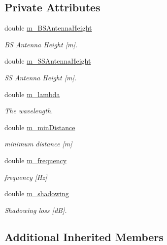 \subsection*{Private Attributes}
\begin{DoxyCompactItemize}
\item 
double \hyperlink{classns3_1_1Cost231PropagationLossModel_ad564778df097fefd5c461ebc814f9d22}{m\+\_\+\+B\+S\+Antenna\+Height}
\begin{DoxyCompactList}\small\item\em BS Antenna Height \mbox{[}m\mbox{]}. \end{DoxyCompactList}\item 
double \hyperlink{classns3_1_1Cost231PropagationLossModel_a143ebc7328775a1c8b5c48ec12692dc1}{m\+\_\+\+S\+S\+Antenna\+Height}
\begin{DoxyCompactList}\small\item\em SS Antenna Height \mbox{[}m\mbox{]}. \end{DoxyCompactList}\item 
double \hyperlink{classns3_1_1Cost231PropagationLossModel_a24ca1169081f00f44d025f6a10bf6db0}{m\+\_\+lambda}
\begin{DoxyCompactList}\small\item\em The wavelength. \end{DoxyCompactList}\item 
double \hyperlink{classns3_1_1Cost231PropagationLossModel_ac4373b88bf096cdd4169ef5c8537b80e}{m\+\_\+min\+Distance}
\begin{DoxyCompactList}\small\item\em minimum distance \mbox{[}m\mbox{]} \end{DoxyCompactList}\item 
double \hyperlink{classns3_1_1Cost231PropagationLossModel_a397d2259ee4c845b903d6abed7b26683}{m\+\_\+frequency}
\begin{DoxyCompactList}\small\item\em frequency \mbox{[}Hz\mbox{]} \end{DoxyCompactList}\item 
double \hyperlink{classns3_1_1Cost231PropagationLossModel_af6164bb5b4a4b4882061049be33bd5e1}{m\+\_\+shadowing}
\begin{DoxyCompactList}\small\item\em Shadowing loss \mbox{[}dB\mbox{]}. \end{DoxyCompactList}\end{DoxyCompactItemize}
\subsection*{Additional Inherited Members}



